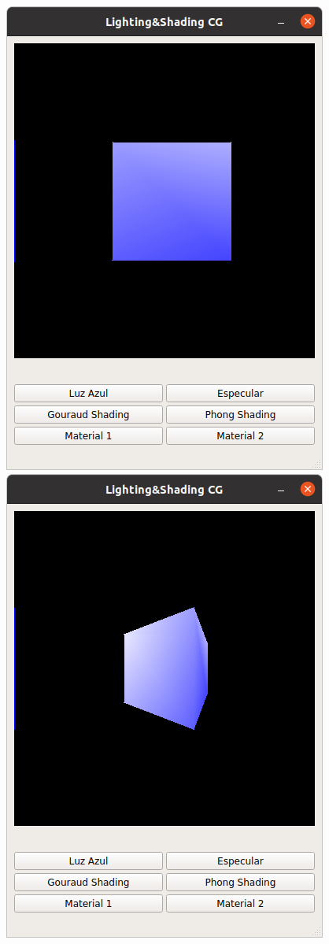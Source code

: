 \documentclass[12pt]{article}
\begin{document}
\begin{figure}[H]
\centering
\includegraphics[scale=0.5]{images/ej1.png}
\includegraphics[scale=0.5]{images/ej2.png}

\end{figure}
\end{document}
